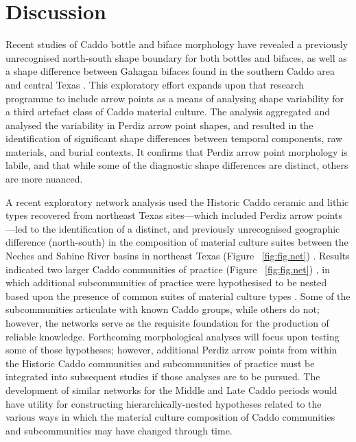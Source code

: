 \documentclass[review]{elsarticle}
\begin{document}
\section*{Discussion}

Recent studies of Caddo bottle and biface morphology have revealed a previously unrecognised north-south shape boundary for both bottles and bifaces, as well as a shape difference between Gahagan bifaces found in the southern Caddo area and central Texas \citep{RN8074,RN7927,RN8158,RN8370,RN8322,RN8312}. This exploratory effort expands upon that research programme to include arrow points as a means of analysing shape variability for a third artefact class of Caddo material culture. The analysis aggregated and analysed the variability in Perdiz arrow point shapes, and resulted in the identification of significant shape differences between temporal components, raw materials, and burial contexts. It confirms that Perdiz arrow point morphology is labile, and that while some of the diagnostic shape differences are distinct, others are more nuanced.

A recent exploratory network analysis used the Historic Caddo ceramic and lithic types recovered from northeast Texas sites---which included Perdiz arrow points---led to the identification of a distinct, and previously unrecognised geographic difference (north-south) in the composition of material culture suites between the Neches and Sabine River basins in northeast Texas (Figure ~\ref{fig:fig.net}) \citep{RN8031}. Results indicated two larger Caddo communities of practice (Figure ~\ref{fig:fig.net}) \citep[Figure 16.4]{RN8031}, in which additional subcommunities of practice were hypothesised to be nested based upon the presence of common suites of material culture types \citep[Figures 16.5 and 16.6]{RN8031}. Some of the subcommunities articulate with known Caddo groups, while others do not; however, the networks serve as the requisite foundation for the production of reliable knowledge. Forthcoming morphological analyses will focus upon testing some of those hypotheses; however, additional Perdiz arrow points from within the Historic Caddo communities and subcommunities of practice must be integrated into subsequent studies if those analyses are to be pursued. The development of similar networks for the Middle and Late Caddo periods would have utility for constructing hierarchically-nested hypotheses related to the various ways in which the material culture composition of Caddo communities and subcommunities may have changed through time.
\end{document}
